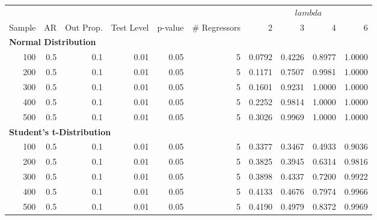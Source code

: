 \begin{table}
\centering
\begin{tabular}{r|r|r|r|r|r|r|r|r|r}
\hline
\multicolumn{6}{c|}{ } & \multicolumn{4}{c}{$lambda$} \\
\cline{7-10}
Sample & AR & Out Prop. & Test Level & p-value & \# Regressors & 2 & 3 & 4 & 6\\
\hline
\multicolumn{10}{l}{\textbf{Normal Distribution}}\\
\hline
\hspace{1em}100 & 0.5 & 0.1 & 0.01 & 0.05 & 5 & 0.0792 & 0.4226 & 0.8977 & 1.0000\\
\hline
\hspace{1em}200 & 0.5 & 0.1 & 0.01 & 0.05 & 5 & 0.1171 & 0.7507 & 0.9981 & 1.0000\\
\hline
\hspace{1em}300 & 0.5 & 0.1 & 0.01 & 0.05 & 5 & 0.1601 & 0.9231 & 1.0000 & 1.0000\\
\hline
\hspace{1em}400 & 0.5 & 0.1 & 0.01 & 0.05 & 5 & 0.2252 & 0.9814 & 1.0000 & 1.0000\\
\hline
\hspace{1em}500 & 0.5 & 0.1 & 0.01 & 0.05 & 5 & 0.3026 & 0.9969 & 1.0000 & 1.0000\\
\hline
\multicolumn{10}{l}{\textbf{Student's t-Distribution}}\\
\hline
\hspace{1em}100 & 0.5 & 0.1 & 0.01 & 0.05 & 5 & 0.3377 & 0.3467 & 0.4933 & 0.9036\\
\hline
\hspace{1em}200 & 0.5 & 0.1 & 0.01 & 0.05 & 5 & 0.3825 & 0.3945 & 0.6314 & 0.9816\\
\hline
\hspace{1em}300 & 0.5 & 0.1 & 0.01 & 0.05 & 5 & 0.3898 & 0.4337 & 0.7200 & 0.9922\\
\hline
\hspace{1em}400 & 0.5 & 0.1 & 0.01 & 0.05 & 5 & 0.4133 & 0.4676 & 0.7974 & 0.9966\\
\hline
\hspace{1em}500 & 0.5 & 0.1 & 0.01 & 0.05 & 5 & 0.4190 & 0.4979 & 0.8372 & 0.9969\\
\hline
\end{tabular}
\end{table}
